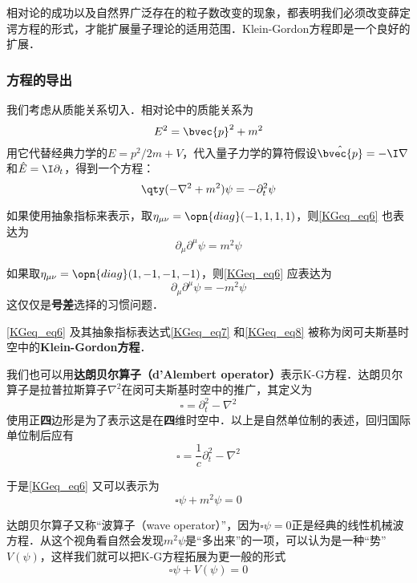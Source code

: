 相对论的成功以及自然界广泛存在的粒子数改变的现象，都表明我们必须改变薛定谔方程的形式，才能扩展量子理论的适用范围．Klein-Gordon方程即是一个良好的扩展．

\subsubsection{方程的导出}

我们考虑从质能关系切入．相对论中的质能关系为
\begin{equation}
E^2=\bvec{p}^2+m^2
\end{equation}
用它代替经典力学的$E=p^2/2m+V$，代入量子力学的算符假设$\hat{\bvec{p}}=-\I\nabla$和$\hat{E}=\I\partial_t$，得到一个方程：
\begin{equation}\label{KGeq_eq6}
\qty(-\nabla^2+m^2)\psi = -\partial_t^2 \psi
\end{equation}

如果使用抽象指标来表示，取$\eta_{\mu\nu}=\opn{diag}(-1, 1, 1, 1)$，则\autoref{KGeq_eq6} 也表达为
\begin{equation}\label{KGeq_eq7}
\partial_\mu\partial^\mu \psi = m^2\psi
\end{equation}

如果取$\eta_{\mu\nu}=\opn{diag}(1, -1, -1, -1)$，则\autoref{KGeq_eq6} 应表达为
\begin{equation}\label{KGeq_eq8}
\partial_\mu\partial^\mu \psi = -m^2\psi
\end{equation}
这仅仅是\textbf{号差}选择的习惯问题．

\autoref{KGeq_eq6} 及其抽象指标表达式\autoref{KGeq_eq7} 和\autoref{KGeq_eq8} 被称为闵可夫斯基时空中的\textbf{Klein-Gordon方程}．

我们也可以用\textbf{达朗贝尔算子（d'Alembert operator）}表示K-G方程．达朗贝尔算子是拉普拉斯算子$\nabla^2$在闵可夫斯基时空中的推广，其定义为
\begin{equation}
\square = \partial_t^2-\nabla^2
\end{equation}
使用正\textbf{四}边形是为了表示这是在\textbf{四}维时空中．以上是自然单位制的表述，回归国际单位制后应有
\begin{equation}
\square = \frac{1}{c}\partial_t^2-\nabla^2
\end{equation}

于是\autoref{KGeq_eq6} 又可以表示为
\begin{equation}
\square \psi + m^2\psi = 0
\end{equation}



达朗贝尔算子又称“波算子（wave operator）”，因为$\square \psi=0$正是经典的线性机械波方程．从这个视角看自然会发现$m^2\psi$是“多出来”的一项，可以认为是一种“势”$V(\psi)$，这样我们就可以把K-G方程拓展为更一般的形式
\begin{equation}
\square\psi + V(\psi) = 0
\end{equation}


